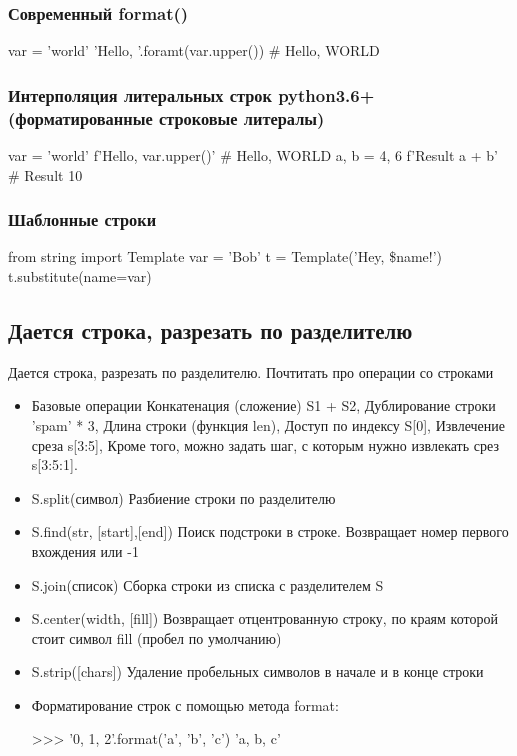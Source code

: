 \subsubsection{Современный format()}

\begin{python}
var = 'world'
'Hello, {}'.foramt(var.upper())
# Hello, WORLD 
\end{python}

\subsubsection{Интерполяция литеральных строк python3.6+ (форматированные строковые литералы)}

\begin{python}
var = 'world'
f'Hello, {var.upper()}'
# Hello, WORLD
a, b = 4, 6
f'Result {a + b}'
# Result 10
\end{python}

\subsubsection{Шаблонные строки}

\begin{python}
from string import Template
var = 'Bob'
t = Template('Hey, \$name!')
t.substitute(name=var)
\end{python}

\subsection{Дается строка, разрезать по разделителю}

	Дается строка, разрезать по разделителю. Почтитать про операции со строками
	
	\begin{itemize}
	
		\item Базовые операции
		Конкатенация (сложение) S1 + S2, Дублирование строки 'spam' * 3, Длина строки (функция len), Доступ по индексу S[0], Извлечение среза s[3:5], Кроме того, можно задать шаг, с которым нужно извлекать срез s[3:5:1]. 
		\item S.split(символ)	Разбиение строки по разделителю
		\item S.find(str, [start],[end])	Поиск подстроки в строке. Возвращает номер первого вхождения или -1
		\item S.join(список)	Сборка строки из списка с разделителем S
		\item S.center(width, [fill])	Возвращает отцентрованную строку, по краям которой стоит символ fill (пробел по умолчанию)
		\item S.strip([chars])	Удаление пробельных символов в начале и в конце строки
		\item Форматирование строк с помощью метода format:
		\begin{python}
			>>> '{0}, {1}, {2}'.format('a', 'b', 'c')
			'a, b, c'
		\end{python}
	\end{itemize}
	
